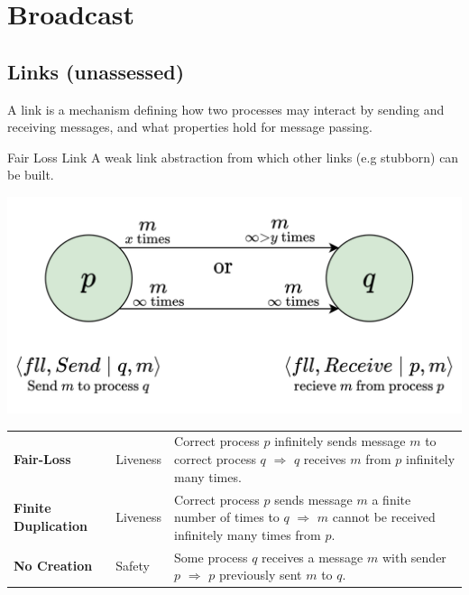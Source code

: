 \chapter{Broadcast}
\section{Links (unassessed)}
A link is a mechanism defining how two processes may interact by sending and receiving messages, and what properties hold for message passing.

\begin{definitionbox}{Fair Loss Link}
    A weak link abstraction from which other links (e.g stubborn) can be built.
    \begin{center}
        \includegraphics[width=.6\textwidth]{broadcast/images/fair_loss_links.drawio.png}
    \end{center}
    \begin{tabular}{l l p{}}
        \textbf{Fair-Loss} & Liveness & Correct process $p$ infinitely sends message $m$ to correct process $q$ $\Rightarrow$ $q$ receives $m$ from $p$ infinitely many times. \\
        \textbf{Finite Duplication} & Liveness & Correct process $p$ sends message $m$ a finite number of times to $q$ $\Rightarrow$ $m$ cannot be received infinitely many times from $p$. \\
        \textbf{No Creation} & Safety & Some process $q$ receives a message $m$ with sender $p$ $\Rightarrow$ $p$ previously sent $m$ to $q$. \\
    \end{tabular}
\end{definitionbox}
